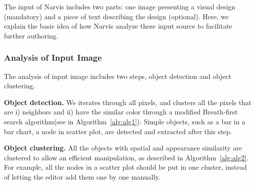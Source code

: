 The input of Narvis includes two parts: one image presenting a visual design (mandatory) and a piece of text describing the design (optional). Here, we explain the basic idea of how Narvis analyze these input source to facilitate further authoring. 

\subsubsection{Analysis of Input Image}
The analysis of input image includes two steps, object detection and object clustering.

\noindent
\textbf{Object detection.} We iterates through all pixels, and clusters all the pixels that are i) neighbors and ii) have the similar color through a modified Breath-first search algorithm(see in Algorithm~\ref{alg:alg1}). Simple objects, such as a bar in a bar chart, a node in scatter plot, are detected and extracted after this step.

\noindent
\textbf{Object clustering.} All the objects with spatial and appearance similarity are clustered to allow an efficient manipulation, as described in Algorithm~\ref{alg:alg2}. For example, all the nodes in a scatter plot should be put in one cluster, instead of letting the editor add them one by one manually.     

